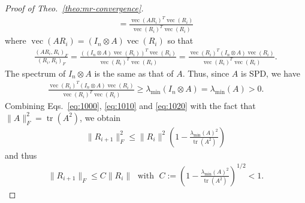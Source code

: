 \documentclass[10pt,a4paper]{amsart}
\begin{document}
\begin{proof}[Proof of Theo.~\ref{theo:mr-convergence}]
\begin{align}
=\frac{\operatorname{vec}(AR_i)^T\operatorname{vec}(R_i)}{\operatorname{vec}(R_i)^T\operatorname{vec}(R_i)}
\end{align}
where $\operatorname{vec}(AR_i)=(I_n\otimes A)\operatorname{vec}(R_i)$ so that
\begin{align}\label{eq:1010}
\frac{(AR_i,R_i)_F}{(R_i,R_i)_F}
=\frac{((I_n\otimes A)\operatorname{vec}(R_i))^T\operatorname{vec}(R_i)}{\operatorname{vec}(R_i)^T\operatorname{vec}(R_i)}
=\frac{\operatorname{vec}(R_i)^T(I_n\otimes A)\operatorname{vec}(R_i)}{\operatorname{vec}(R_i)^T\operatorname{vec}(R_i)}.
\end{align}
The spectrum of $I_n\otimes A$ is the same as that of $A$.
Thus, since $A$ is SPD, we have 
\begin{align}\label{eq:1020}
\frac{\operatorname{vec}(R_i)^T(I_n\otimes A)\operatorname{vec}(R_i)}{\operatorname{vec}(R_i)^T\operatorname{vec}(R_i)}\geq \lambda_{\min}(I_n\otimes A)=\lambda_{\min}(A)>0.
\end{align}
Combining Eqs.~\eqref{eq:1000}, \eqref{eq:1010} and \eqref{eq:1020} with the fact that $\|A\|_F^2=\operatorname{tr}(A^2)$, we obtain
\begin{align}
\|R_{i+1}\|_F^2\leq\|R_i\|^2\left(1-\frac{\lambda_{\min}(A)^2}{\operatorname{tr}(A^2)}\right)
\end{align}
and thus
\begin{align}
\|R_{i+1}\|_F\leq C\|R_i\|
\;\text{ with }\;
C:=\left(1-\frac{\lambda_{\min}(A)^2}{\operatorname{tr}(A^2)}\right)^{1/2}<1. 
\end{align}

\end{proof}
\end{document}
